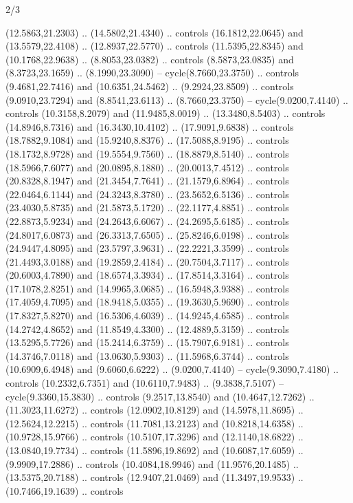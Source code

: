 \begin{flagdescription}{2/3}
\begin{scope}[yshift=\flagwidth,scale=\flagwidth/1241.93737]
\begin{scope}[y=-1mm, x=1mm,draw=gold,fill=blue,line join=miter,miter limit=4,line width=1.8\lw]
\begin{scope}[y=1mm, x=1mm, yscale=-1,shift={(573.68mm+\str,145.75)}]
\begin{scope}[scale=1.35,shift={(-9,-3)}]
\begin{scope}[scale=0.55]
\begin{scope}[scale=1.333]
    (12.5863,21.2303) .. (14.5802,21.4340) .. controls (16.1812,22.0645) and
    (13.5579,22.4108) .. (12.8937,22.5770) .. controls (11.5395,22.8345) and
    (10.1768,22.9638) .. (8.8053,23.0382) .. controls (8.5873,23.0835) and
    (8.3723,23.1659) .. (8.1990,23.3090) -- cycle(8.7660,23.3750) .. controls
    (9.4681,22.7416) and (10.6351,24.5462) .. (9.2924,23.8509) .. controls
    (9.0910,23.7294) and (8.8541,23.6113) .. (8.7660,23.3750) --
    cycle(9.0200,7.4140) .. controls (10.3158,8.2079) and (11.9485,8.0019) ..
    (13.3480,8.5403) .. controls (14.8946,8.7316) and (16.3430,10.4102) ..
    (17.9091,9.6838) .. controls (18.7882,9.1084) and (15.9240,8.8376) ..
    (17.5088,8.9195) .. controls (18.1732,8.9728) and (19.5554,9.7560) ..
    (18.8879,8.5140) .. controls (18.5966,7.6077) and (20.0895,8.1880) ..
    (20.0013,7.4512) .. controls (20.8328,8.1947) and (21.3454,7.7641) ..
    (21.1579,6.8964) .. controls (22.0464,6.1144) and (24.3243,8.3780) ..
    (23.5652,6.5136) .. controls (23.4030,5.8735) and (21.5873,5.1720) ..
    (22.1177,4.8851) .. controls (22.8873,5.9234) and (24.2643,6.6067) ..
    (24.2695,5.6185) .. controls (24.8017,6.0873) and (26.3313,7.6505) ..
    (25.8246,6.0198) .. controls (24.9447,4.8095) and (23.5797,3.9631) ..
    (22.2221,3.3599) .. controls (21.4493,3.0188) and (19.2859,2.4184) ..
    (20.7504,3.7117) .. controls (20.6003,4.7890) and (18.6574,3.3934) ..
    (17.8514,3.3164) .. controls (17.1078,2.8251) and (14.9965,3.0685) ..
    (16.5948,3.9388) .. controls (17.4059,4.7095) and (18.9418,5.0355) ..
    (19.3630,5.9690) .. controls (17.8327,5.8270) and (16.5306,4.6039) ..
    (14.9245,4.6585) .. controls (14.2742,4.8652) and (11.8549,4.3300) ..
    (12.4889,5.3159) .. controls (13.5295,5.7726) and (15.2414,6.3759) ..
    (15.7907,6.9181) .. controls (14.3746,7.0118) and (13.0630,5.9303) ..
    (11.5968,6.3744) .. controls (10.6909,6.4948) and (9.6060,6.6222) ..
    (9.0200,7.4140) -- cycle(9.3090,7.4180) .. controls (10.2332,6.7351) and
    (10.6110,7.9483) .. (9.3838,7.5107) -- cycle(9.3360,15.3830) .. controls
    (9.2517,13.8540) and (10.4647,12.7262) .. (11.3023,11.6272) .. controls
    (12.0902,10.8129) and (14.5978,11.8695) .. (12.5624,12.2215) .. controls
    (11.7081,13.2123) and (10.8218,14.6358) .. (10.9728,15.9766) .. controls
    (10.5107,17.3296) and (12.1140,18.6822) .. (13.0840,19.7734) .. controls
    (11.5896,19.8692) and (10.6087,17.6059) .. (9.9909,17.2886) .. controls
    (10.4084,18.9946) and (11.9576,20.1485) .. (13.5375,20.7188) .. controls
    (12.9407,21.0469) and (11.3497,19.9533) .. (10.7466,19.1639) .. controls

\end{scope}
\end{scope}
\end{scope}
\end{scope}
\end{scope}
\end{scope}
\end{flagdescription}
